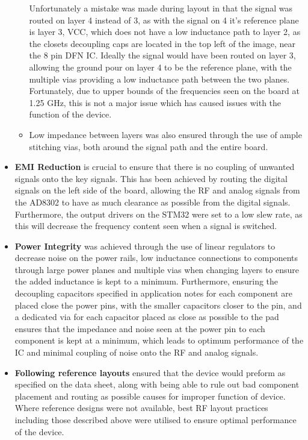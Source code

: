 \begin{itemize}
\begin{itemize}
		Unfortunately a mistake was made during layout in that the signal was routed on layer 4 instead of 3, as with the signal on 4 it's reference plane is layer 3, VCC, which does not have a low inductance path to layer 2, as the closets decoupling caps are located in the top left of the image, near the 8 pin DFN IC. Ideally the signal would have been routed on layer 3,  allowing the ground pour on layer 4 to be the reference plane, with the multiple vias providing a low inductance path between the two planes. Fortunately, due to upper bounds of the frequencies seen on the board at 1.25 GHz, this is not a major issue which has caused issues with the function of the device. 
		\item Low impedance between layers was also ensured through the use of ample stitching vias, both around the signal path and the entire board. 
	\end{itemize}
	\item \textbf{EMI Reduction} is crucial to ensure that there is no coupling of unwanted signals onto the key signals. This has been achieved by routing the digital signals on the left side of the board, allowing the RF and analog signals from the AD8302 to have as much clearance as possible from the digital signals. Furthermore, the output drivers on the STM32 were set to a low slew rate, as this will decrease the frequency content seen when a signal is switched. 
	\item \textbf{Power Integrity} was achieved through the use of linear regulators to decrease noise on the power rails, low inductance connections to components through large power planes and multiple vias when changing layers to ensure the added inductance is kept to a minimum. Furthermore, ensuring the decoupling capacitors specified in application notes for each component are placed close the power pins, with the smaller capacitors closer to the pin, and a dedicated via for each capacitor placed as close as possible to the pad ensures that the impedance and noise seen at the power pin to each component is kept at a minimum, which leads to optimum performance of the IC and minimal coupling of noise onto the RF and analog signals.
	\item \textbf{Following reference layouts} ensured that the device would preform as specified on the data sheet, along with being able to rule out bad component placement and routing as possible causes for improper function of device. Where reference designs were not available, best RF layout practices including those described above were utilised to ensure optimal performance of the device.  
\end{itemize} 

